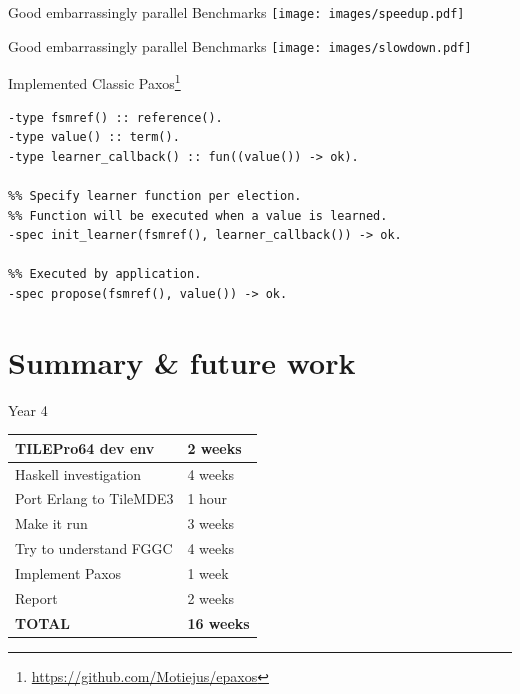 \documentclass[14pt]{beamer}
\begin{document}
\begin{frame}{Good embarrassingly parallel Benchmarks}
    \texttt{[image: images/speedup.pdf]}
\end{frame}

\begin{frame}{Good embarrassingly parallel Benchmarks}
    \texttt{[image: images/slowdown.pdf]}
\end{frame}

\begin{frame}[fragile]{Implemented Classic Paxos\footnote{
    \url{https://github.com/Motiejus/epaxos}}}

        \fontsize{11pt}{14}\selectfont \begin{verbatim}
-type fsmref() :: reference().
-type value() :: term().
-type learner_callback() :: fun((value()) -> ok).

%% Specify learner function per election.
%% Function will be executed when a value is learned.
-spec init_learner(fsmref(), learner_callback()) -> ok.

%% Executed by application.
-spec propose(fsmref(), value()) -> ok.
    \end{verbatim}
\end{frame}

\section{Summary \& future work}

\begin{frame}{Year 4}
    \begin{tabular}{|l|l|}
        \hline
        TILEPro64 dev env & 2 weeks \\ \hline
    Haskell investigation & 4 weeks \\ \hline
  Port Erlang to TileMDE3 & 1 hour \\ \hline
              Make it run & 3 weeks \\ \hline
   Try to understand FGGC & 4 weeks \\ \hline
          Implement Paxos & 1 week \\ \hline
                   Report & 2 weeks \\ \hline \hline
               \bf{TOTAL} & \bf{16 weeks} \\ \hline
    \end{tabular}
\end{frame}
\end{document}
